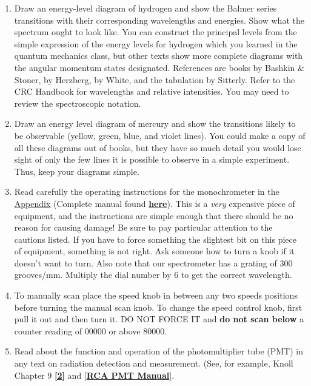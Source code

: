 \documentclass{../lab}
\begin{document}
\begin{enumerate}
    \item Draw an energy-level diagram of hydrogen and show the Balmer series transitions with their corresponding wavelengths and energies. Show what the spectrum ought to look like. You can construct the principal levels from the simple expression of the energy levels for hydrogen which you learned in the quantum mechanics class, but other texts show more complete diagrams with the angular momentum states designated. References are books by Bashkin \& Stoner, by Herzberg, by White, and the tabulation by Sitterly. Refer to the CRC Handbook for wavelengths and relative intensities. You may need to review the spectroscopic notation.

    \item Draw an energy level diagram of mercury and show the transitions likely to be observable (yellow, green, blue, and violet lines).
	You could make a copy of all these diagrams out of books, but they have so much detail you would lose sight of only the few lines it is possible to observe in a simple experiment. Thus, keep your diagrams simple.

    \item Read carefully the operating instructions for the monochrometer in the \hyperref[sec:Appendix]{ Appendix}
    (Complete manual found \href{http://physics111.lib.berkeley.edu/Physics111/Reprints/ATM/Acton\%20.5\%20atmospheric\%20monochromator.pdf}{\textbf{here}}). This is a \emph{very} expensive piece of equipment, and the instructions are simple enough that there should be no reason for causing damage! Be sure to pay particular attention to the cautions listed. If you have to force something the slightest bit on this piece of equipment, something is not right. Ask someone how to turn a knob if it doesn't want to turn. Also note that our spectrometer has a grating of 300 grooves/mm. Multiply the dial number by 6 to get the correct wavelength.

    \item To manually scan place the speed knob in between any two speeds positions before turning the manual scan knob. To change the speed control knob, first pull it out and then turn it. DO NOT FORCE IT and \textbf{do not scan below} a counter reading of 00000 or above 80000.

    \item Read about the function and operation of the photomultiplier tube (PMT) in any text on radiation detection and measurement. (See, for example, Knoll Chapter 9 \href{http://physics111.lib.berkeley.edu/Physics111/Reprints/Knoll-Radiation\%20Detection\%20&\%20Measurement/01-Radiation\_Detection\_and\_Measurement\_CH\_09.pdf}{\textbf{[2]}} and [\href{http://physics111.lib.berkeley.edu/Physics111/Reprints/GMA/RCA\%20PMT.pdf}{\textbf{RCA PMT Manual}}].
    

\end{enumerate}
\end{document}
